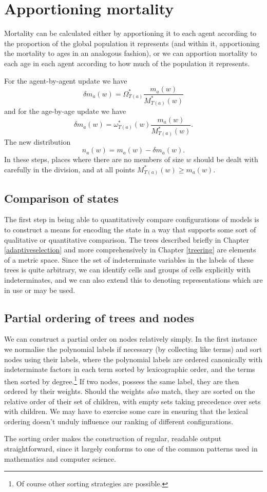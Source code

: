 \section{Apportioning mortality}

Mortality can be calculated either by apportioning it to each agent according
to the proportion of the global population it represents (and within it,
apportioning the mortality to ages in an analogous fashion), or we can
apportion mortality to each age in each agent according to how much of the
population it represents.

For the agent-by-agent update we have
\[ \delta m_a (w) = \Omega^{\ast}_{T (a)}  \frac{m_a (w)}{M^{\ast}_{T (a)}
   (w)} \]
and for the age-by-age update we have
\[ \delta m_a (w) = \omega^{\ast}_{T (a)} (w)  \frac{m_a (w)}{M^{\ast}_{T (a)}
   (w)} . \]
The new distribution
\[ n_a (w) = m_a (w) - \delta m_a (w) . \]
In these steps, places where there are no members of size $w$ should be dealt
with carefully in the division, and at all points $M^{\ast}_{T (a)} (w)
\geqslant m_a (w)$.






\subsection{Comparison of states}
The first step in being able to quantitatively compare configurations
of models is to construct a means for encoding the state in a way that
supports some sort of qualitative or quantitative comparison.  The
trees described briefly in Chapter \ref{adaptiveselection} and more
comprehensively in Chapter \ref{treering} are elements of a metric
space. Since the set of indeterminate variables in the labels of these
trees is quite arbitrary, we can identify cells and groups of cells
explicitly with indeterminates, and we can also extend this to
denoting representations which are in use or may be used.

\subsection{Partial ordering of trees and nodes}\label{partial-order}
We can construct a partial order on nodes relatively simply.  In the
first instance we normalise the polynomial labels if necessary (by
collecting like terms) and sort nodes using their labels, where the polynomial labels are
ordered canonically with indeterminate factors in each term sorted by
lexicographic order, and the terms then sorted by degree.\footnote{Of course
other sorting strategies are possible.} If two nodes, possess the same
label, they are then ordered by their weights.  Should the weights
\emph{also} match, they are sorted on the relative order of their set
of children, with empty sets taking precedence over sets with
children. We may have to exercise some care in ensuring that the
lexical ordering doesn't unduly influence our ranking of different
configurations. 

The sorting order makes the construction of regular, readable output
straightforward, since it largely conforms to one of the common
patterns used in mathematics and computer science. 
